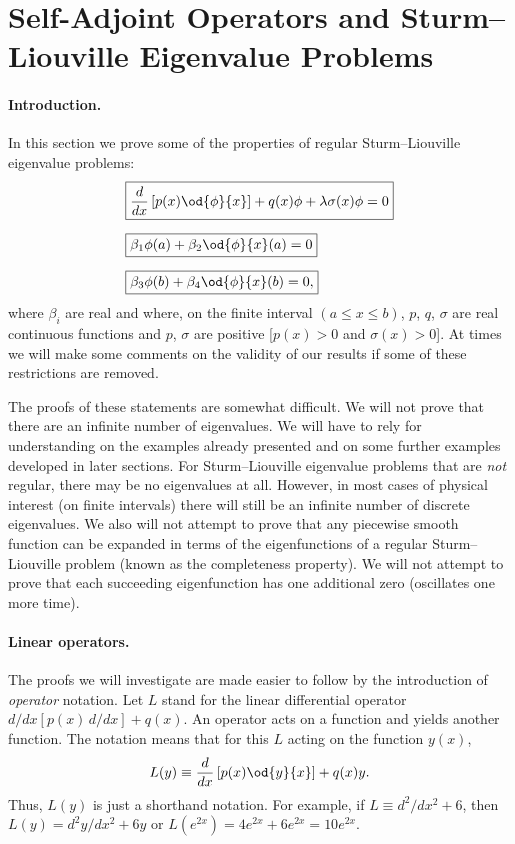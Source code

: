 \section{Self-Adjoint Operators and Sturm--Liouville Eigenvalue Problems}
\label{sec:sl-selfadjoint}

\paragraph{Introduction.}
In this section we prove some of the properties of regular Sturm--Liouville eigenvalue problems:
\begin{align}
\label{eq:sa-sl}
& \boxed{\frac{d}{d x}\left[p(x)\od{\phi}{x}\right] + q(x)\phi + \lambda\sigma(x)\phi = 0} \\[6pt]
\label{eq:sa-bc-a}
& \boxed{\beta_1\phi(a) + \beta_2\od{\phi}{x}(a) = 0} \\[6pt]
\label{eq:sa-bc-b}
& \boxed{\beta_3\phi(b) + \beta_4\od{\phi}{x}(b) = 0,}
\end{align}
where $\beta_i$ are real and where, on the finite interval $(a \le x \le b)$, $p$, $q$, $\sigma$ are real continuous functions and $p$, $\sigma$ are positive [$p(x) > 0$ and $\sigma(x) > 0$].  At times we will make some comments on the validity of our results if some of these restrictions are removed.

The proofs of these statements are somewhat difficult.  We will not prove that there are an infinite number of eigenvalues.  We will have to rely for understanding on the examples already presented and on some further examples developed in later sections.  For Sturm--Liouville eigenvalue problems that are \textit{not} regular, there may be no eigenvalues at all.  However, in most cases of physical interest (on finite intervals) there will still be an infinite number of discrete eigenvalues.  We also will not attempt to prove that any piecewise smooth function can be expanded in terms of the eigenfunctions of a regular Sturm--Liouville problem (known as the completeness property).  We will not attempt to prove that each succeeding eigenfunction has one additional zero (oscillates one more time).

\paragraph{Linear operators.}
The proofs we will investigate are made easier to follow by the introduction of \textit{operator} notation.  Let $L$ stand for the linear differential operator $d/dx[p(x)\,d/dx] + q(x)$.  An operator acts on a function and yields another function.  The notation means that for this $L$ acting on the function $y(x)$,
\begin{equation}
\label{eq:operator-L}
L(y) \equiv \frac{d}{d x}\left[p(x)\od{y}{x}\right] + q(x)y.
\end{equation}
Thus, $L(y)$ is just a shorthand notation.  For example, if $L \equiv d^2/dx^2 + 6$, then $L(y) = d^2y/dx^2 + 6y$ or $L(e^{2x}) = 4e^{2x} + 6e^{2x} = 10e^{2x}$.

